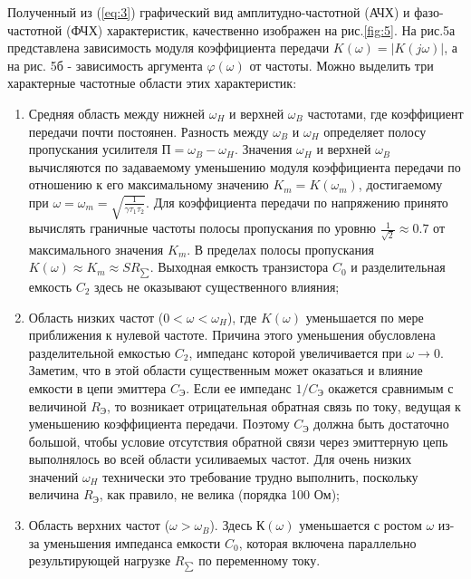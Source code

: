 Полученный из (\ref{eq:3}) графический вид амплитудно-частотной (АЧХ) и фазо-частотной (ФЧХ) характеристик, качественно изображен на рис.\ref{fig:5}. На рис.5а представлена зависимость модуля коэффициента передачи $K(\omega) = |K(j\omega)|$, а на рис. 5б - зависимость аргумента $\varphi(\omega)$ от частоты. Можно выделить три характерные
частотные области этих характеристик:
\begin{enumerate}
	\item Средняя область между нижней $\omega_H$ и верхней $\omega_B$ частотами, где коэффициент передачи почти постоянен. Разность между $\omega_B$ и $\omega_H$ определяет полосу пропускания усилителя $\text{П}=\omega_B - \omega_H$. Значения $\omega_H$ и верхней $\omega_B$ вычисляются по задаваемому уменьшению модуля коэффициента передачи по отношению к его максимальному значению $K_m=K(\omega_m)$, достигаемому при $\omega=\omega_m=\sqrt{\frac{1}{\gamma \tau_1 \tau_2}}$. Для коэффициента передачи по напряжению принято вычислять граничные частоты полосы пропускания по уровню $\frac{1}{\sqrt{2}} \approx 0.7$ от максимального значения $K_m$. В пределах полосы пропускания $K(\omega) \approx K_m \approx SR_{\sum}$. Выходная емкость транзистора $C_0$ и разделительная емкость $C_2$ здесь не оказывают существенного влияния; 

	\item Область низких частот ($0 <\omega<\omega_H$), где $K(\omega)$ уменьшается по мере приближения к нулевой частоте. Причина этого уменьшения обусловлена разделительной емкостью $C_2$, импеданс которой увеличивается при $\omega \rightarrow 0$. Заметим, что в этой области существенным может оказаться и влияние емкости в цепи эмиттера $C_{\text{Э}}$. Если ее импеданс $1/C_{\text{Э}}$ окажется сравнимым с величиной $R_{\text{Э}}$, то возникает отрицательная обратная связь по току, ведущая к уменьшению коэффициента передачи. Поэтому $C_{\text{Э}}$ должна быть достаточно большой, чтобы условие отсутствия обратной связи через эмиттерную цепь выполнялось во всей области усиливаемых частот. Для очень низких значений $\omega_H$ технически это требование трудно выполнить, поскольку величина $R_{\text{Э}}$, как правило, не велика (порядка 100 Ом);

	\item Область верхних частот ($\omega > \omega_B$). Здесь $К(\omega)$ уменьшается с ростом $\omega$ из-за уменьшения импеданса емкости $C_0$, которая включена параллельно результирующей нагрузке $R_{\sum}$ по переменному току.
\end{enumerate}

